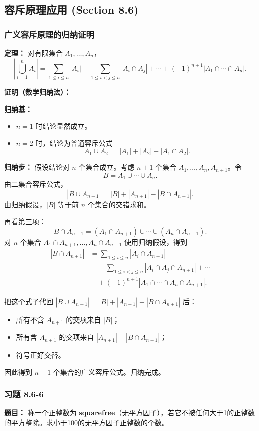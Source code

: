 \documentclass[11pt,UTF8]{article}
\begin{document}
\subsection{容斥原理应用 (Section 8.6)}

\subsubsection*{广义容斥原理的归纳证明}

\textbf{定理：} 对有限集合 $A_1,\ldots,A_n$，
\[ \left|\bigcup_{i=1}^{n}A_i\right|=\sum_{1\le i\le n}|A_i|-\sum_{1\le i<j\le n}|A_i\cap A_j|+\cdots+(-1)^{n+1}|A_1\cap\cdots\cap A_n|. \]

\textbf{证明（数学归纳法）：}

\textbf{归纳基：}
\begin{itemize}
    \item $n=1$ 时结论显然成立。
    \item $n=2$ 时，结论为普通容斥公式
    \[ |A_1\cup A_2|=|A_1|+|A_2|-|A_1\cap A_2|. \]
\end{itemize}

\textbf{归纳步：} 假设结论对 $n$ 个集合成立。考虑 $n+1$ 个集合 $A_1,\ldots,A_n,A_{n+1}$。令
\[ B=A_1\cup\cdots\cup A_n. \]
由二集合容斥公式，
\[ |B\cup A_{n+1}|=|B|+|A_{n+1}|-|B\cap A_{n+1}|. \]
由归纳假设，$|B|$ 等于前 $n$ 个集合的交错求和。

再看第三项：
\[ B\cap A_{n+1}=(A_1\cap A_{n+1})\cup\cdots\cup(A_n\cap A_{n+1}). \]
对 $n$ 个集合 $A_1\cap A_{n+1},\ldots,A_n\cap A_{n+1}$ 使用归纳假设，得到
\begin{align*}
|B\cap A_{n+1}| &= \sum_{1\le i\le n}|A_i\cap A_{n+1}|\\
&\quad-\sum_{1\le i<j\le n}|A_i\cap A_j\cap A_{n+1}|+\cdots\\
&\quad+(-1)^{n+1}|A_1\cap\cdots\cap A_n\cap A_{n+1}|.
\end{align*}

把这个式子代回 $|B\cup A_{n+1}|=|B|+|A_{n+1}|-|B\cap A_{n+1}|$ 后：
\begin{itemize}
    \item 所有不含 $A_{n+1}$ 的交项来自 $|B|$；
    \item 所有含 $A_{n+1}$ 的交项来自 $|A_{n+1}|-|B\cap A_{n+1}|$；
    \item 符号正好交替。
\end{itemize}
因此得到 $n+1$ 个集合的广义容斥公式。归纳完成。

\subsubsection*{习题 8.6-6}
\textbf{题目：} 称一个正整数为 \textbf{squarefree}（无平方因子），若它不被任何大于1的正整数的平方整除。求小于100的无平方因子正整数的个数。
\end{document}
